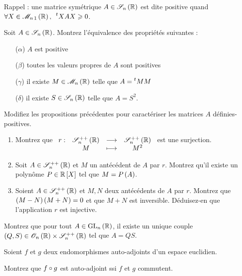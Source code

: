 \begin{exoss}
Rappel : une matrice symétrique \(A\in\sym{n}[\R]\) est dite positive quand \(\quantifs{\forall X\in\M{n\,1}[\R]}\trans{X}AX\geq0\).

Soit \(A\in\sym{n}[\R]\). Montrez l'équivalence des propriétés suivantes :

\begin{enumerate}
    \item[(\(\alpha\))] \(A\) est positive \\
    \item[(\(\beta\))] toutes les valeurs propres de \(A\) sont positives \\
    \item[(\(\gamma\))] il existe \(M\in\M{n}[\R]\) telle que \(A=\prescript{t}{}{M}M\) \\
    \item[(\(\delta\))] il existe \(S\in\sym{n}[\R]\) telle que \(A=S^2\).
\end{enumerate}

Modifiez les propositions précédentes pour caractériser les matrices \(A\) définies-positives.
\end{exoss}

\begin{exosss}
\begin{enumerate}
    \item Montrez que \(\fonction{r}{\symdefpos{n}[\R]}{\symdefpos{n}[\R]}{M}{M^2}\) est une surjection. \\
    \item Soit \(A\in\symdefpos{n}[\R]\) et \(M\) un antécédent de \(A\) par \(r\). Montrez qu'il existe un polynôme \(P\in\poly[\R]\) tel que \(M=P\left(A\right)\). \\
    \item Soient \(A\in\symdefpos{n}[\R]\) et \(M,N\) deux antécédents de \(A\) par \(r\). Montrez que \(\left(M-N\right)\left(M+N\right)=0\) et que \(M+N\) est inversible. Déduisez-en que l'application \(r\) est injective.
\end{enumerate}
\end{exosss}

\begin{exosss}
Montrez que pour tout \(A\in\GL{n}[\R]\), il existe un unique couple \(\paren{Q,S}\in\Orth{n}[\R]\times\symdefpos{n}[\R]\) tel que \(A=QS\).
\end{exosss}

\begin{exoss}
Soient \(f\) et \(g\) deux endomorphismes auto-adjoints d'un espace euclidien.

Montrez que \(f\circ g\) est auto-adjoint ssi \(f\) et \(g\) commutent.
\end{exoss}

